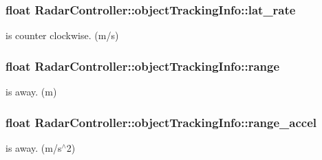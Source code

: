 \subsubsection[{lat\+\_\+rate}]{\setlength{\rightskip}{0pt plus 5cm}float Radar\+Controller\+::object\+Tracking\+Info\+::lat\+\_\+rate}\label{struct_radar_controller_1_1object_tracking_info_a232c799e920e93faac192726993f32cd}

\begin{DoxyItemize}
\item is counter clockwise. (m/s) 
\end{DoxyItemize}\hypertarget{struct_radar_controller_1_1object_tracking_info_a09342f3b1f19b9c9f188d912ebc54371}{}
\subsubsection[{range}]{\setlength{\rightskip}{0pt plus 5cm}float Radar\+Controller\+::object\+Tracking\+Info\+::range}\label{struct_radar_controller_1_1object_tracking_info_a09342f3b1f19b9c9f188d912ebc54371}

\begin{DoxyItemize}
\item is away. (m) 
\end{DoxyItemize}\hypertarget{struct_radar_controller_1_1object_tracking_info_ae5b537d910d05bbf716c5a38b8677eed}{}
\subsubsection[{range\+\_\+accel}]{\setlength{\rightskip}{0pt plus 5cm}float Radar\+Controller\+::object\+Tracking\+Info\+::range\+\_\+accel}\label{struct_radar_controller_1_1object_tracking_info_ae5b537d910d05bbf716c5a38b8677eed}

\begin{DoxyItemize}
\item is away. (m/s$^\wedge$2) 
\end{DoxyItemize}\hypertarget{struct_radar_controller_1_1object_tracking_info_a52d996bdc367f363dada5af01960171b}{}
